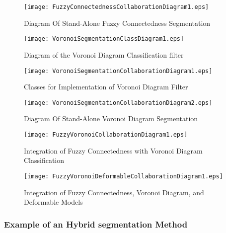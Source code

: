 \begin{figure}
\center
\texttt{[image: FuzzyConnectednessCollaborationDiagram1.eps]}
\caption{Diagram Of Stand-Alone Fuzzy Connectedness Segmentation}
\label{fig:UMLCollaborationDiagramoftheFuzzyConnectednessFilter}
\end{figure}

\begin{figure}
\center
\texttt{[image: VoronoiSegmentationClassDiagram1.eps]}
\caption{Diagram of the Voronoi Diagram Classification filter}
\label{fig:UMLVoronoiSegmentationClassFilter}
\end{figure}

\begin{figure}
\center
\texttt{[image: VoronoiSegmentationCollaborationDiagram1.eps]}
\caption{Classes for Implementation of Voronoi Diagram Filter}
\label{fig:UMLClassesforImplementationofVoronoiDiagramFilter}
\end{figure}


\begin{figure}
\center
\texttt{[image: VoronoiSegmentationCollaborationDiagram2.eps]}
\caption{Diagram Of Stand-Alone Voronoi Diagram Segmentation}
\label{fig:UMLCollaborationDiagramoftheVoronoiSegmentationFilter}
\end{figure}


\begin{figure}
\center
\texttt{[image: FuzzyVoronoiCollaborationDiagram1.eps]}
\caption{Integration of Fuzzy Connectedness with Voronoi Diagram Classification}
\label{fig:UMLHybridMethodDiagram1}
\end{figure}

\begin{figure}
\center
\texttt{[image: FuzzyVoronoiDeformableCollaborationDiagram1.eps]}
\caption{Integration of Fuzzy Connectedness, Voronoi Diagram, and Deformable Models}
\label{fig:UMLHybridMethodDiagram2}
\end{figure}



\subsubsection{Example of an Hybrid segmentation Method}
\label{sec:HybridMethod1:Example}

\ifitkFullVersion

\fi



